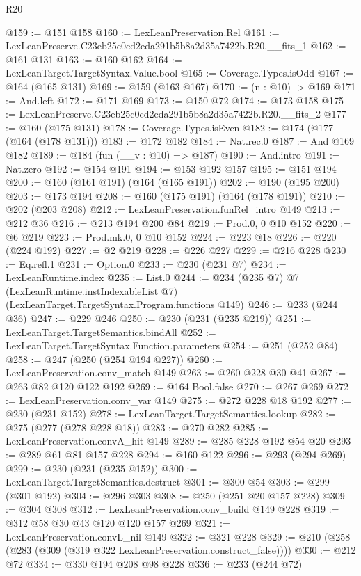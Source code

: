 \begin{lexlean}{R20}
\begin{coremodule}
@159 := @151 @158
@160 := LexLeanPreservation.Rel
@161 := LexLeanPreserve.C23eb25c0cd2eda291b5b8a2d35a7422b.R20.__fits_1
@162 := @161 @131
@163 := @160 @162
@164 := LexLeanTarget.TargetSyntax.Value.bool
@165 := Coverage.Types.isOdd
@167 := @164 (@165 @131)
@169 := @159 (@163 @167)
@170 := (n : @10) -> @169
@171 := And.left
@172 := @171 @169
@173 := @150 @72
@174 := @173 @158
@175 := LexLeanPreserve.C23eb25c0cd2eda291b5b8a2d35a7422b.R20.__fits_2
@177 := @160 (@175 @131)
@178 := Coverage.Types.isEven
@182 := @174 (@177 (@164 (@178 @131)))
@183 := @172 @182
@184 := Nat.rec.{0}
@187 := And @169 @182
@189 := @184 (fun (__v : @10) => @187)
@190 := And.intro
@191 := Nat.zero
@192 := @154 @191
@194 := @153 @192 @157
@195 := @151 @194
@200 := @160 (@161 @191) (@164 (@165 @191))
@202 := @190 (@195 @200)
@203 := @173 @194
@208 := @160 (@175 @191) (@164 (@178 @191))
@210 := @202 (@203 @208)
@212 := LexLeanPreservation.funRel_intro @149
@213 := @212 @36
@216 := @213 @194 @200 @84
@219 := Prod.{0, 0} @10 @152
@220 := @6 @219
@223 := Prod.mk.{0, 0} @10 @152
@224 := @223 @18
@226 := @220 (@224 @192)
@227 := @2 @219
@228 := @226 @227
@229 := @216 @228
@230 := Eq.refl.{1}
@231 := Option.{0}
@233 := @230 (@231 @7)
@234 := LexLeanRuntime.index
@235 := List.{0}
@244 := @234
    (@235 @7)
    @7
    (LexLeanRuntime.instIndexableList @7)
    (LexLeanTarget.TargetSyntax.Program.functions @149)
@246 := @233 (@244 @36)
@247 := @229 @246
@250 := @230 (@231 (@235 @219))
@251 := LexLeanTarget.TargetSemantics.bindAll
@252 := LexLeanTarget.TargetSyntax.Function.parameters
@254 := @251 (@252 @84)
@258 := @247 (@250 (@254 @194 @227))
@260 := LexLeanPreservation.conv_match @149
@263 := @260 @228 @30 @41
@267 := @263 @82 @120 @122 @192
@269 := @164 Bool.false
@270 := @267 @269
@272 := LexLeanPreservation.conv_var @149
@275 := @272 @228 @18 @192
@277 := @230 (@231 @152)
@278 := LexLeanTarget.TargetSemantics.lookup
@282 := @275 (@277 (@278 @228 @18))
@283 := @270 @282
@285 := LexLeanPreservation.convA_hit @149
@289 := @285 @228 @192 @54 @20
@293 := @289 @61 @81 @157 @228
@294 := @160 @122
@296 := @293 (@294 @269)
@299 := @230 (@231 (@235 @152))
@300 := LexLeanTarget.TargetSemantics.destruct
@301 := @300 @54
@303 := @299 (@301 @192)
@304 := @296 @303
@308 := @250 (@251 @20 @157 @228)
@309 := @304 @308
@312 := LexLeanPreservation.conv_build @149 @228
@319 := @312 @58 @30 @43 @120 @120 @157 @269
@321 := LexLeanPreservation.convL_nil @149
@322 := @321 @228
@329 := @210 (@258 (@283 (@309 (@319 @322 LexLeanPreservation.construct_false))))
@330 := @212 @72
@334 := @330 @194 @208 @98 @228
@336 := @233 (@244 @72)

\end{coremodule}
\end{lexlean}
